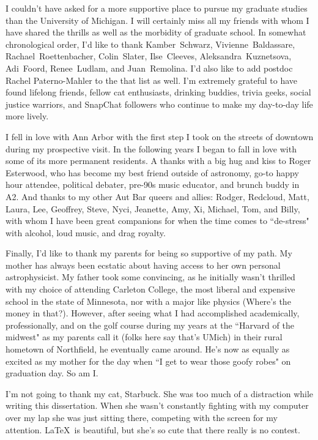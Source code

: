 I couldn't have asked for a more supportive place to pursue my graduate studies than the University of Michigan. I will certainly miss all my friends with whom I have shared the thrills as well as the morbidity of graduate school. In somewhat chronological order, I'd like to thank Kamber~Schwarz, Vivienne~Baldassare, Rachael~Roettenbacher, Colin~Slater, Ilse~Cleeves, Aleksandra~Kuznetsova, Adi~Foord, Renee~Ludlam, and Juan~Remolina. I'd also like to add postdoc Rachel Paterno-Mahler to the that list as well. I'm extremely grateful to have found lifelong friends, fellow cat enthusiasts, drinking buddies, trivia geeks, social justice warriors, and SnapChat followers who continue to make my day-to-day life more lively.

I fell in love with Ann Arbor with the first step I took on the streets of downtown during my prospective visit. In the following years I began to fall in love with some of its more permanent residents. A thanks with a big hug and kiss to Roger Esterwood, who has become my best friend outside of astronomy, go-to happy hour attendee, political debater, pre-90s music educator, and brunch buddy in A2. And thanks to my other Aut Bar queers and allies: Rodger, Redcloud, Matt, Laura, Lee, Geoffrey, Steve, Nyci, Jeanette, Amy, Xi, Michael, Tom, and Billy, with whom I have been great companions for when the time comes to ``de-stress" with alcohol, loud music, and drag royalty.

Finally, I'd like to thank my parents for being so supportive of my path. My mother has always been ecstatic about having access to her own personal astrophysicist. My father took some convincing, as he initially wasn't thrilled with my choice of attending Carleton College, the most liberal and expensive school in the state of Minnesota, nor with a major like physics (Where's the money in that?). However, after seeing what I had accomplished academically, professionally, and on the golf course during my years at the ``Harvard of the midwest" as my parents call it (folks here say that's UMich) in their rural hometown of Northfield, he eventually came around. He's now as equally as excited as my mother for the day when ``I get to wear those goofy robes" on graduation day. So am I.

I'm not going to thank my cat, Starbuck. She was too much of a distraction while writing this dissertation. When she wasn't constantly fighting with my computer over my lap she was just sitting there, competing with the screen for my attention. \LaTeX\ is beautiful, but she's so cute that there really is no contest.
